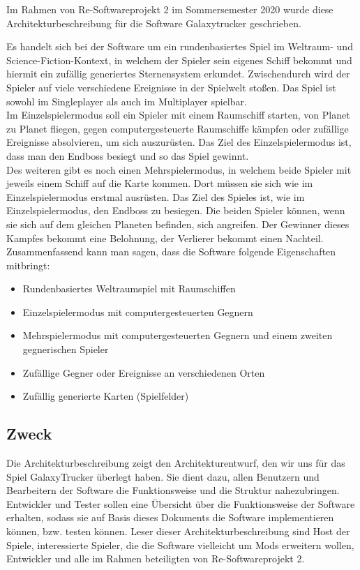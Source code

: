 \documentclass[fontsize=12pt,paper=a4,twoside]{scrartcl}
\begin{document}
Im Rahmen von Re-Softwareprojekt 2 im Sommersemester 2020 wurde diese Architekturbeschreibung für die Software Galaxytrucker geschrieben.

Es handelt sich bei der Software um ein rundenbasiertes Spiel im Weltraum- und Science-Fiction-Kontext, in welchem der Spieler sein eigenes Schiff bekommt und hiermit ein zufällig generiertes Sternensystem erkundet. Zwischendurch wird der Spieler auf viele verschiedene Ereignisse in der Spielwelt stoßen. 
Das Spiel ist sowohl im Singleplayer als auch im Multiplayer spielbar.\\
Im Einzelspielermodus soll ein Spieler mit einem Raumschiff starten, von Planet zu Planet fliegen, gegen computergesteuerte Raumschiffe kämpfen oder zufällige Ereignisse absolvieren, um sich auszurüsten. Das Ziel des Einzelspielermodus ist, dass man den Endboss besiegt und so das Spiel gewinnt. \\
Des weiteren gibt es noch einen Mehrspielermodus, in welchem beide Spieler mit jeweils einem Schiff auf die Karte kommen. Dort müssen sie sich wie im Einzelspielermodus erstmal ausrüsten. Das Ziel des Spieles ist, wie im Einzelspielermodus, den Endboss zu besiegen. Die beiden Spieler können, wenn sie sich auf dem gleichen Planeten befinden, sich angreifen. Der Gewinner dieses Kampfes bekommt eine Belohnung, der Verlierer bekommt einen Nachteil. 
Zusammenfassend kann man sagen, dass die Software folgende Eigenschaften mitbringt: 

\begin{itemize}
\item{Rundenbasiertes Weltraumspiel mit Raumschiffen}
\item{Einzelspielermodus mit computergesteuerten Gegnern}
\item{Mehrspielermodus mit computergesteuerten Gegnern und einem zweiten gegnerischen Spieler}
\item{Zufällige Gegner oder Ereignisse an verschiedenen Orten}
\item{Zufällig generierte Karten (Spielfelder)}
\end{itemize}



\subsection{Zweck}

Die Architekturbeschreibung zeigt den Architekturentwurf, den wir uns für das Spiel GalaxyTrucker überlegt haben. Sie dient dazu, allen Benutzern und Bearbeitern der Software die Funktionsweise und die Struktur nahezubringen. Entwickler und Tester sollen eine Übersicht über die Funktionsweise der Software erhalten, sodass sie auf Basis dieses Dokuments die Software implementieren können, bzw. testen können. 
Leser dieser Architekturbeschreibung sind Host der Spiele, interessierte Spieler, die die Software vielleicht um Mods erweitern wollen, Entwickler und alle im Rahmen beteiligten von Re-Softwareprojekt 2. 
\end{document}

